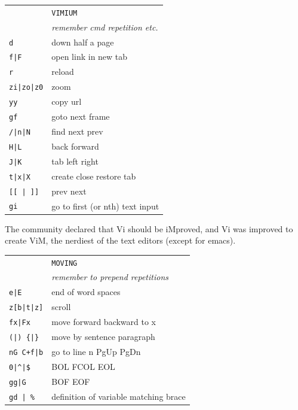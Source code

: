 \documentclass[a4paper,12pt]{article}
\begin{document}
\begin{multicols}{2}
\begin{tabular}{ll}
&\texttt{VIMIUM}\\
&\emph{remember cmd repetition etc.}\\
\texttt{d}&down half a page\\
\texttt{f|F}&open link \textbar{} in new tab\\
\texttt{r}&reload\\
\texttt{zi|zo|z0}&zoom\\
\texttt{yy}&copy url\\
\texttt{gf}&goto next frame\\
\texttt{/|n|N}&find \textbar{} next \textbar{} prev\\
\texttt{H|L}&back \textbar{} forward\\
\texttt{J|K}&tab left \textbar{} right\\
\texttt{t|x|X}&create \textbar{} close \textbar{} restore tab\\
\texttt{[[ | ]]}&prev \textbar{} next\\
\texttt{gi}&go to first (or nth) text input\\
\end{tabular}
\vfill
\columnbreak
The community declared that Vi should be iMproved, and Vi was improved to
create ViM, the nerdiest of the text editors (except for emacs).
\bigskip
\begin{tabular}{ll}
&\texttt{MOVING}\\
&\emph{remember to prepend repetitions}\\
\texttt{e|E}& end of word \textbar{} spaces\\
\texttt{z[b|t|z]}& scroll\\
\texttt{fx|Fx}& move forward \textbar{} backward to x\\
\texttt{(|) \{|\}}& move by sentence \textbar{} paragraph\\
\texttt{nG C+f|b}& go to line n PgUp \textbar{} PgDn\\
\texttt{0|\^{}|\$}& BOL \textbar{} FCOL \textbar{}EOL\\
\texttt{gg|G}&BOF \textbar{} EOF\\
\texttt{gd | \%}& definition of variable \textbar{} matching brace\\

\end{tabular}
\end{multicols}
\end{document}
